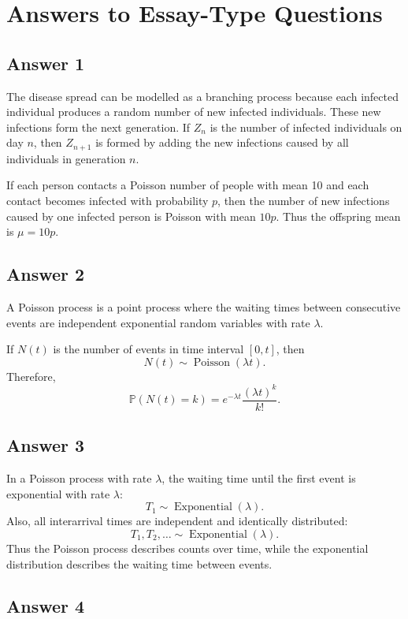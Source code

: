 \documentclass[12pt,a4paper]{article}
\theoremstyle{lecturestyle}
\newcommand{\Prob}{\mathbb{P}}
\begin{document}
\section{Answers to Essay-Type Questions}

\subsection*{Answer 1}

The disease spread can be modelled as a branching process because each infected individual produces a random number of new infected individuals. These new infections form the next generation. If $Z_n$ is the number of infected individuals on day $n$, then $Z_{n+1}$ is formed by adding the new infections caused by all individuals in generation $n$.

If each person contacts a Poisson number of people with mean 10 and each contact becomes infected with probability $p$, then the number of new infections caused by one infected person is Poisson with mean $10p$. Thus the offspring mean is $\mu=10p$.

\subsection*{Answer 2}

A Poisson process is a point process where the waiting times between consecutive events are independent exponential random variables with rate $\lambda$.

If $N(t)$ is the number of events in time interval $[0,t]$, then
\[
N(t)\sim \operatorname{Poisson}(\lambda t).
\]
Therefore,
\[
\Prob(N(t)=k)=e^{-\lambda t}\frac{(\lambda t)^k}{k!}.
\]

\subsection*{Answer 3}

In a Poisson process with rate $\lambda$, the waiting time until the first event is exponential with rate $\lambda$:
\[
T_1\sim \operatorname{Exponential}(\lambda).
\]
Also, all interarrival times are independent and identically distributed:
\[
T_1,T_2,\ldots \sim \operatorname{Exponential}(\lambda).
\]
Thus the Poisson process describes counts over time, while the exponential distribution describes the waiting time between events.

\subsection*{Answer 4}
\end{document}
